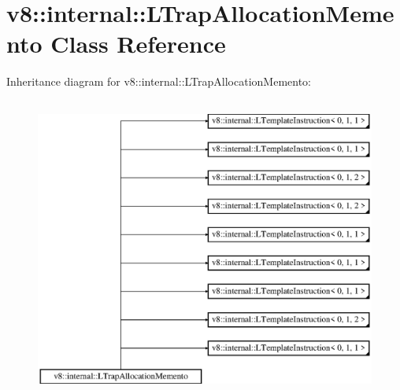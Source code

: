 \hypertarget{classv8_1_1internal_1_1_l_trap_allocation_memento}{}\section{v8\+:\+:internal\+:\+:L\+Trap\+Allocation\+Memento Class Reference}
\label{classv8_1_1internal_1_1_l_trap_allocation_memento}
Inheritance diagram for v8\+:\+:internal\+:\+:L\+Trap\+Allocation\+Memento\+:\begin{figure}[H]
\begin{center}
\leavevmode
\includegraphics[height=10.000000cm]{classv8_1_1internal_1_1_l_trap_allocation_memento}
\end{center}
\end{figure}
